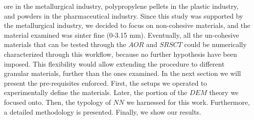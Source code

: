 ore in the metallurgical industry, polypropylene pellets in the plastic industry,
and powders in the pharmaceutical industry.
Since this study was supported by the metallurgical industry, we decided to
focus on non-cohesive materials, and the material examined was sinter fine
(0-3.15 mm).
Eventually, all the un-cohesive materials that can be tested through the $AOR$
and $SRSCT$ could be numerically characterized through this workflow, because no
further hypothesis have been imposed.
This flexibility would allow extending the procedure to different granular materials, further than the ones examined.
In the next section we will present the pre-requisites enforced. 
First, the setups we operated to experimentally define the materials. 
Later, the portion of the $DEM$ theory we focused onto. 
Then, the typology of $NN$ we harnessed for this work. 
Furthermore, a detailed methodology is presented. Finally, we show our results.

